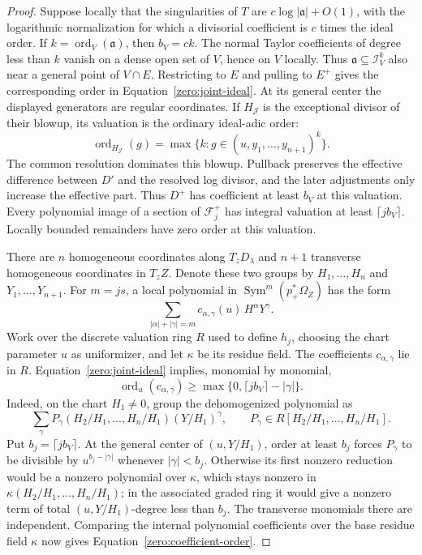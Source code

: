 \begin{proof}
Suppose locally that the singularities of \(T\) are
\(c\log|\mathfrak a|+O(1)\), with the logarithmic normalization for
which a divisorial coefficient is \(c\) times the ideal order.  If
\(k=\operatorname{ord}_V(\mathfrak a)\), then \(b_V=ck\).
The normal Taylor coefficients of degree less than \(k\) vanish on a
dense open set of \(V\), hence on \(V\) locally.  Thus
\(\mathfrak a\subseteq\mathcal I_V^k\) also near a general point of
\(V\cap E\).  Restricting to \(E\) and pulling to \(E^+\) gives the
corresponding order in Equation~\eqref{zero:joint-ideal}.  At its general center
the displayed generators are regular coordinates.  If \(H_{\mathcal J}\)
is the exceptional divisor of their blowup, its valuation is the
ordinary ideal-adic order:
\[
 \operatorname{ord}_{H_{\mathcal J}}(g)
  =\max\{k:g\in(u,y_1,\ldots,y_{n+1})^k\}.
\]
The common resolution dominates this blowup.  Pullback preserves the
effective difference between \(D'\) and the resolved log divisor,
and the later adjustments only increase the effective part.  Thus
\(D^+\) has coefficient at least \(b_V\) at this valuation.
Every polynomial image of a section of \(\mathcal F_j^+\) has
integral valuation at least \(\lceil jb_V\rceil\).  Locally bounded
remainders have zero order at this valuation.

There are \(n\) homogeneous coordinates along \(T_zD_\lambda\) and
\(n+1\) transverse homogeneous coordinates in \(T_zZ\).  Denote
these two groups by \(H_1,\ldots,H_n\) and
\(Y_1,\ldots,Y_{n+1}\).  For \(m=js\), a local polynomial in
\(\operatorname{Sym}^m(p_+^*\Omega_Z)\) has the form
\[
 \sum_{|\alpha|+|\gamma|=m}
          c_{\alpha,\gamma}(u)\,H^\alpha Y^\gamma.
\]
Work over the discrete valuation ring \(R\) used to define \(h_j\), choosing
the chart parameter \(u\) as uniformizer, and let \(\kappa\) be its residue
field.  The coefficients \(c_{\alpha,\gamma}\) lie in \(R\).
Equation~\eqref{zero:joint-ideal}
implies, monomial by monomial,
\begin{equation}\label{zero:coefficient-order}
 \operatorname{ord}_u(c_{\alpha,\gamma})
       \ge\max\{0,\lceil jb_V\rceil-|\gamma|\}.
\end{equation}
Indeed, on the chart \(H_1\ne0\), group the dehomogenized polynomial as
\[
 \sum_\gamma
 P_\gamma(H_2/H_1,\ldots,H_n/H_1)(Y/H_1)^\gamma,
 \qquad P_\gamma\in R[H_2/H_1,\ldots,H_n/H_1].
\]
Put \(b_j=\lceil jb_V\rceil\).  At the general center of
\((u,Y/H_1)\), order at least \(b_j\) forces
\(P_\gamma\) to be divisible by \(u^{b_j-|\gamma|}\) whenever
\(|\gamma|<b_j\).  Otherwise its first nonzero reduction would be a
nonzero polynomial over \(\kappa\), which stays nonzero in
\(\kappa(H_2/H_1,\ldots,H_n/H_1)\); in the associated graded ring
it would give a nonzero term of total \((u,Y/H_1)\)-degree less than
\(b_j\).  The transverse monomials there are independent.  Comparing
the internal polynomial coefficients over the base residue field
\(\kappa\) now gives Equation~\eqref{zero:coefficient-order}.


\end{proof}
